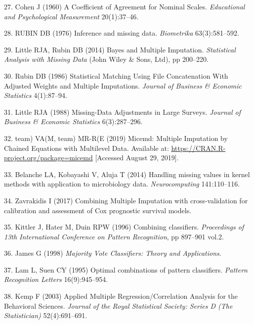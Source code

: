 \documentclass[12pt,]{article}
\begin{document}
\hypertarget{ref-cohen_coefficient_1960}{}
27. Cohen J (1960) A Coefficient of Agreement for Nominal Scales.
\emph{Educational and Psychological Measurement} 20(1):37--46.

\hypertarget{ref-rubin_inference_1976}{}
28. RUBIN DB (1976) Inference and missing data. \emph{Biometrika}
63(3):581--592.

\hypertarget{ref-little_bayes_2014}{}
29. Little RJA, Rubin DB (2014) Bayes and Multiple Imputation.
\emph{Statistical Analysis with Missing Data} (John Wiley \& Sons, Ltd),
pp 200--220.

\hypertarget{ref-rubin_statistical_1986}{}
30. Rubin DB (1986) Statistical Matching Using File Concatenation With
Adjusted Weights and Multiple Imputations. \emph{Journal of Business \&
Economic Statistics} 4(1):87--94.

\hypertarget{ref-little_missing-data_1988}{}
31. Little RJA (1988) Missing-Data Adjustments in Large Surveys.
\emph{Journal of Business \& Economic Statistics} 6(3):287--296.

\hypertarget{ref-team_micemd:_2019}{}
32. team) VA(M, team) MR-R(E (2019) Micemd: Multiple Imputation by
Chained Equations with Multilevel Data. Available at:
\url{https://CRAN.R-project.org/package=micemd} {[}Accessed August 29,
2019{]}.

\hypertarget{ref-belanche_handling_2014}{}
33. Belanche LA, Kobayashi V, Aluja T (2014) Handling missing values in
kernel methods with application to microbiology data.
\emph{Neurocomputing} 141:110--116.

\hypertarget{ref-zavrakidis_combining_2017}{}
34. Zavrakidis I (2017) Combining Multiple Imputation with
cross-validation for calibration and assessment of Cox prognostic
survival models.

\hypertarget{ref-kittler_combining_1996}{}
35. Kittler J, Hater M, Duin RPW (1996) Combining classifiers.
\emph{Proceedings of 13th International Conference on Pattern
Recognition}, pp 897--901 vol.2.

\hypertarget{ref-james_majority_1998}{}
36. James G (1998) \emph{Majority Vote Classifiers: Theory and
Applications}.

\hypertarget{ref-lam_optimal_1995}{}
37. Lam L, Suen CY (1995) Optimal combinations of pattern classifiers.
\emph{Pattern Recognition Letters} 16(9):945--954.

\hypertarget{ref-kemp_applied_2003}{}
38. Kemp F (2003) Applied Multiple Regression/Correlation Analysis for
the Behavioral Sciences. \emph{Journal of the Royal Statistical Society:
Series D (The Statistician)} 52(4):691--691.
\end{document}
